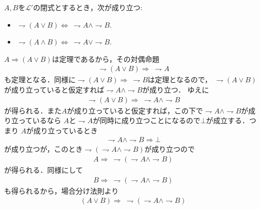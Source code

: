 	\begin{screen}
		\begin{metathm}[De Morganの法則]
			$A,B$を$\mathcal{L}'$の閉式とするとき，次が成り立つ:
			\begin{itemize}
				\item $\rightharpoondown (A \vee B) \Longleftrightarrow\ \rightharpoondown A \wedge \rightharpoondown B$.
			
				\item $\rightharpoondown (A \wedge B) \Longleftrightarrow\ \rightharpoondown A \vee \rightharpoondown B$.
			\end{itemize}
		\end{metathm}
	\end{screen}
	
	\begin{prf}
		$A \Longrightarrow (A \vee B)$は定理であるから，その対偶命題
		\begin{align}
			\rightharpoondown (A \vee B) \Longrightarrow\ \rightharpoondown A
		\end{align}
		も定理となる．同様に$\rightharpoondown (A \vee B) \Longrightarrow\ \rightharpoondown B$は定理となるので，
		$\rightharpoondown (A \vee B)$が成り立っていると仮定すれば$\rightharpoondown A \wedge \rightharpoondown B$が成り立つ．
		ゆえに
		\begin{align}
			\rightharpoondown (A \vee B) \Longrightarrow\ \rightharpoondown A \wedge \rightharpoondown B
		\end{align}
		が得られる．また$A$が成り立っていると仮定すれば，この下で$\rightharpoondown A \wedge \rightharpoondown B$が成り立っているなら
		$A$と$\rightharpoondown A$が同時に成り立つことになるので$\bot$が成立する．つまり
		$A$が成り立っているとき
		\begin{align}
			\rightharpoondown A \wedge \rightharpoondown B \Longrightarrow \bot
		\end{align}
		が成り立つが，このとき$\rightharpoondown(\rightharpoondown A \wedge \rightharpoondown B)$が成り立つので
		\begin{align}
			A \Longrightarrow\ \rightharpoondown(\rightharpoondown A \wedge \rightharpoondown B)
		\end{align}
		が得られる．同様にして
		\begin{align}
			B \Longrightarrow\ \rightharpoondown(\rightharpoondown A \wedge \rightharpoondown B)
		\end{align}
		も得られるから，場合分け法則より
		\begin{align}
			(A \vee B) \Longrightarrow\ \rightharpoondown(\rightharpoondown A \wedge \rightharpoondown B)

\end{align}
\end{prf}
